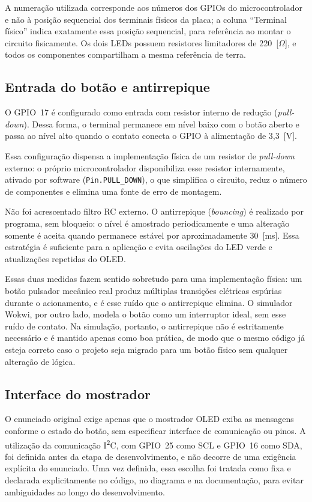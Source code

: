 \documentclass[12pt,a4paper]{article}
\begin{document}
A numeração utilizada corresponde aos números dos GPIOs do microcontrolador e não à posição sequencial dos terminais físicos da placa; a coluna ``Terminal físico'' indica exatamente essa posição sequencial, para referência ao montar o circuito fisicamente. Os dois LEDs possuem resistores limitadores de 220~[$\Omega$], e todos os componentes compartilham a mesma referência de terra.

\subsection{Entrada do botão e antirrepique}

O GPIO~17 é configurado como entrada com resistor interno de redução (\textit{pull-down}). Dessa forma, o terminal permanece em nível baixo com o botão aberto e passa ao nível alto quando o contato conecta o GPIO à alimentação de 3,3~[V].

Essa configuração dispensa a implementação física de um resistor de \textit{pull-down} externo: o próprio microcontrolador disponibiliza esse resistor internamente, ativado por software (\texttt{Pin.PULL\_DOWN}), o que simplifica o circuito, reduz o número de componentes e elimina uma fonte de erro de montagem.

Não foi acrescentado filtro RC externo. O antirrepique (\textit{bouncing}) é realizado por programa, sem bloqueio: o nível é amostrado periodicamente e uma alteração somente é aceita quando permanece estável por aproximadamente 30~[ms]. Essa estratégia é suficiente para a aplicação e evita oscilações do LED verde e atualizações repetidas do OLED.

Essas duas medidas fazem sentido sobretudo para uma implementação física: um botão pulsador mecânico real produz múltiplas transições elétricas espúrias durante o acionamento, e é esse ruído que o antirrepique elimina. O simulador Wokwi, por outro lado, modela o botão como um interruptor ideal, sem esse ruído de contato. Na simulação, portanto, o antirrepique não é estritamente necessário e é mantido apenas como boa prática, de modo que o mesmo código já esteja correto caso o projeto seja migrado para um botão físico sem qualquer alteração de lógica.

\subsection{Interface do mostrador}

O enunciado original exige apenas que o mostrador OLED exiba as mensagens conforme o estado do botão, sem especificar interface de comunicação ou pinos. A utilização da comunicação I\textsuperscript{2}C, com GPIO~25 como SCL e GPIO~16 como SDA, foi definida antes da etapa de desenvolvimento, e não decorre de uma exigência explícita do enunciado. Uma vez definida, essa escolha foi tratada como fixa e declarada explicitamente no código, no diagrama e na documentação, para evitar ambiguidades ao longo do desenvolvimento.
\end{document}
